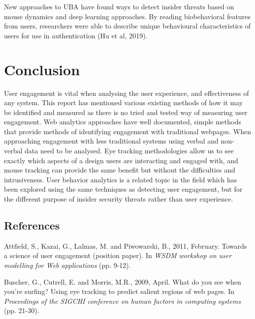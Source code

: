\documentclass[12pt]{article}
\renewcommand{\_}{\kern-1.5pt\textunderscore\kern-1.5pt}
\begin{document}
\vspace{\baselineskip}
 New approaches to UBA have found ways to detect insider threats based on mouse dynamics and deep learning approaches. By reading biobehavioral features from users, researchers were able to describe unique behavioural characteristics of users for use in authentication (Hu et al, 2019).\par


\vspace{\baselineskip}
\section*{Conclusion}
User engagement is vital when analysing the user experience, and effectiveness of any system. This report has mentioned various existing methods of how it may be identified and measured as there is no tried and tested way of measuring user engagement. Web analytics approaches have well documented, simple methods that provide methods of identifying engagement with traditional webpages. When approaching engagement with less traditional systems using verbal and non-verbal data need to be analysed. Eye tracking methodologies allow us to see exactly which aspects of a design users are interacting and engaged with, and mouse tracking can provide the same benefit but without the difficulties and intrusiveness. User behavior analytics is a related topic in the field which has been explored using the same techniques as detecting user engagement, but for the different purpose of insider security threats rather than user experience.\par

\subsection*{References}

\par

Attfield, S., Kazai, G., Lalmas, M. and Piwowarski, B., 2011, February. Towards a science of user engagement (position paper). In \textit{WSDM workshop on user modelling for Web applications} (pp. 9-12).\par


\vspace{\baselineskip}
Buscher, G., Cutrell, E. and Morris, M.R., 2009, April. What do you see when you're surfing? Using eye tracking to predict salient regions of web pages. In \textit{Proceedings of the SIGCHI conference on human factors in computing systems} (pp. 21-30).\par
\end{document}
